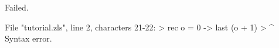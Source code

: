 \chklistingfalse
{}
\begin{ChkListingMsg}
Failed.
\end{ChkListingMsg}
\begin{ChkListingErr}
File "tutorial.zls", line 2, characters 21-22:
>  rec o = 0 -> last (o + 1)
>                     ^
Syntax error.
\end{ChkListingErr}
